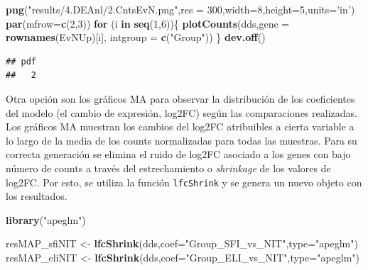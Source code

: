 \documentclass[
]{article}
\newenvironment{Shaded}{\begin{snugshade}}{\end{snugshade}}
\newcommand{\ControlFlowTok}[1]{\textcolor[rgb]{0.13,0.29,0.53}{\textbf{#1}}}
\newcommand{\DataTypeTok}[1]{\textcolor[rgb]{0.13,0.29,0.53}{#1}}
\newcommand{\DecValTok}[1]{\textcolor[rgb]{0.00,0.00,0.81}{#1}}
\newcommand{\KeywordTok}[1]{\textcolor[rgb]{0.13,0.29,0.53}{\textbf{#1}}}
\newcommand{\NormalTok}[1]{#1}
\newcommand{\StringTok}[1]{\textcolor[rgb]{0.31,0.60,0.02}{#1}}
\begin{document}
\begin{Shaded}
\begin{Highlighting}[]
\KeywordTok{png}\NormalTok{(}\StringTok{"results/4.DEAnl/2.CntsEvN.png"}\NormalTok{,}\DataTypeTok{res =} \DecValTok{300}\NormalTok{,}\DataTypeTok{width=}\DecValTok{8}\NormalTok{,}\DataTypeTok{height=}\DecValTok{5}\NormalTok{,}\DataTypeTok{units=}\StringTok{'in'}\NormalTok{)}
\KeywordTok{par}\NormalTok{(}\DataTypeTok{mfrow=}\KeywordTok{c}\NormalTok{(}\DecValTok{2}\NormalTok{,}\DecValTok{3}\NormalTok{))}
\ControlFlowTok{for}\NormalTok{ (i }\ControlFlowTok{in} \KeywordTok{seq}\NormalTok{(}\DecValTok{1}\NormalTok{,}\DecValTok{6}\NormalTok{))\{}
  \KeywordTok{plotCounts}\NormalTok{(dds,}\DataTypeTok{gene =} \KeywordTok{rownames}\NormalTok{(EvNUp)[i], }\DataTypeTok{intgroup =} \KeywordTok{c}\NormalTok{(}\StringTok{"Group"}\NormalTok{))}
\NormalTok{\}}
\KeywordTok{dev.off}\NormalTok{()}
\end{Highlighting}
\end{Shaded}

\begin{verbatim}
## pdf 
##   2
\end{verbatim}

Otra opción son los gráficos MA para observar la distribución de los
coeficientes del modelo (el cambio de expresión, log2FC) según las
comparaciones realizadas. Los gráficos MA muestran los cambios del
log2FC atribuibles a cierta variable a lo largo de la media de los
counts normalizadas para todas las muestras. Para su correcta generación
se elimina el ruido de log2FC asociado a los genes con bajo número de
counts a través del estrechamiento o \emph{shrinkage} de los valores de
log2FC. Por esto, se utiliza la función \texttt{lfcShrink} y se genera
un nuevo objeto con los resultados.

\begin{Shaded}
\begin{Highlighting}[]
\KeywordTok{library}\NormalTok{(}\StringTok{"apeglm"}\NormalTok{)}
\end{Highlighting}
\end{Shaded}

\begin{Shaded}
\begin{Highlighting}[]
\NormalTok{resMAP_sfiNIT <-}\StringTok{ }\KeywordTok{lfcShrink}\NormalTok{(dds,}\DataTypeTok{coef=}\StringTok{"Group_SFI_vs_NIT"}\NormalTok{,}\DataTypeTok{type=}\StringTok{"apeglm"}\NormalTok{)}
\NormalTok{resMAP_eliNIT <-}\StringTok{ }\KeywordTok{lfcShrink}\NormalTok{(dds,}\DataTypeTok{coef=}\StringTok{"Group_ELI_vs_NIT"}\NormalTok{,}\DataTypeTok{type=}\StringTok{"apeglm"}\NormalTok{)}
\end{Highlighting}
\end{Shaded}
\end{document}
